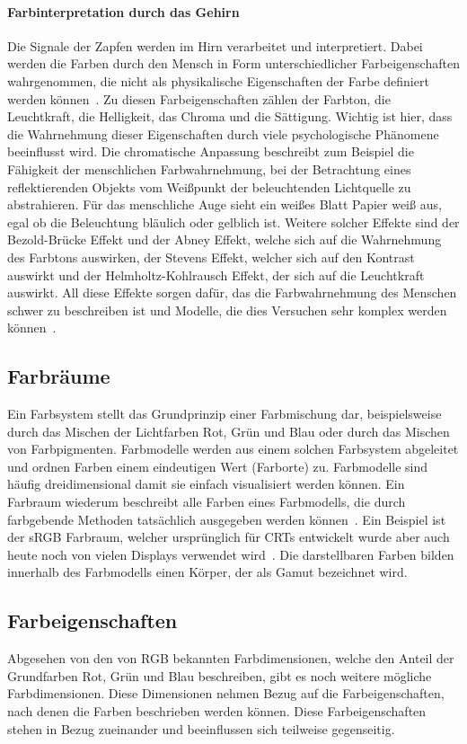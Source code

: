\documentclass[12pt, a4paper, ngerman]{article}
\begin{document}
\paragraph{Farbinterpretation durch das Gehirn}
Die Signale der Zapfen werden im Hirn verarbeitet und interpretiert. 
Dabei werden die Farben durch den Mensch in Form unterschiedlicher Farbeigenschaften wahrgenommen, 
die nicht als physikalische Eigenschaften der Farbe definiert werden können~\cite{Ottosson_2020}.
Zu diesen Farbeigenschaften zählen der Farbton, die Leuchtkraft, die Helligkeit, das Chroma und die Sättigung.
Wichtig ist hier, dass die Wahrnehmung dieser Eigenschaften durch viele psychologische Phänomene beeinflusst wird.
Die chromatische Anpassung beschreibt zum Beispiel die Fähigkeit der menschlichen Farbwahrnehmung, 
bei der Betrachtung eines reflektierenden Objekts vom Weißpunkt der beleuchtenden Lichtquelle zu abstrahieren. 
Für das menschliche Auge sieht ein weißes Blatt Papier weiß aus, egal ob die Beleuchtung bläulich oder gelblich ist.
Weitere solcher Effekte sind der Bezold-Brücke Effekt und der Abney Effekt, welche sich auf die Wahrnehmung des Farbtons auswirken,
der Stevens Effekt, welcher sich auf den Kontrast auswirkt und der Helmholtz-Kohlrausch Effekt, der sich auf die Leuchtkraft auswirkt.
All diese Effekte sorgen dafür, das die Farbwahrnehmung des Menschen schwer zu beschreiben ist und Modelle, die dies Versuchen sehr komplex werden können~\cite{Color_appearance_model_2023}.

\subsection{Farbräume}
Ein Farbsystem stellt das Grundprinzip einer Farbmischung dar, 
beispielsweise durch das Mischen der Lichtfarben Rot, Grün und Blau oder durch das Mischen von Farbpigmenten.
Farbmodelle werden aus einem solchen Farbsystem abgeleitet und ordnen Farben einem eindeutigen Wert (Farborte) zu.
Farbmodelle sind häufig dreidimensional damit sie einfach visualisiert werden können.
Ein Farbraum wiederum beschreibt alle Farben eines Farbmodells, die durch farbgebende Methoden tatsächlich ausgegeben werden können~\cite{Farbraum_2023}.
Ein Beispiel ist der \acs{sRGB} Farbraum, welcher ursprünglich für \acs{CRT}s entwickelt wurde aber auch heute noch von vielen Displays verwendet wird~\cite{sRGB-Farbraum_2019}.
Die darstellbaren Farben bilden innerhalb des Farbmodells einen Körper, der als Gamut bezeichnet wird.

\subsection{Farbeigenschaften} 
Abgesehen von den von \acs{RGB} bekannten Farbdimensionen, welche den Anteil der Grundfarben Rot, Grün und Blau beschreiben, 
gibt es noch weitere mögliche Farbdimensionen. Diese Dimensionen nehmen Bezug auf die Farbeigenschaften, nach denen die Farben beschrieben werden können.
Diese Farbeigenschaften stehen in Bezug zueinander und beeinflussen sich teilweise gegenseitig.
\end{document}
